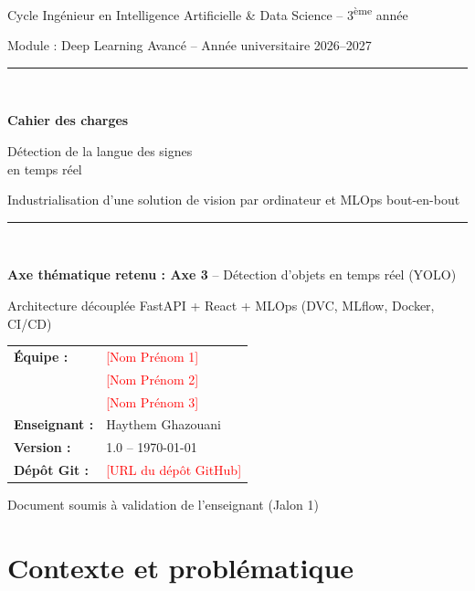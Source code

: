 \documentclass[11pt,a4paper]{article}
\newcommand{\todo}[1]{\textcolor{red}{[#1]}}
\begin{document}
\begin{titlepage}
\centering
\vspace*{1cm}
{\large Cycle Ingénieur en Intelligence Artificielle \& Data Science -- 3\textsuperscript{ème} année\par}
\vspace{0.5cm}
{\large Module : Deep Learning Avancé -- Année universitaire 2026--2027\par}
\vspace{2cm}
{\color{accent}\rule{\linewidth}{1.5pt}}\\[0.6cm]
{\Huge\bfseries Cahier des charges\par}
\vspace{0.4cm}
{\LARGE Détection de la langue des signes\\en temps réel\par}
\vspace{0.4cm}
{\large Industrialisation d'une solution de vision par ordinateur et MLOps bout-en-bout\par}
\vspace{0.3cm}
{\color{accent}\rule{\linewidth}{1.5pt}}\\[1.5cm]

{\large \textbf{Axe thématique retenu : Axe 3} -- Détection d'objets en temps réel (YOLO)\par}
\vspace{0.5cm}
{\large Architecture découplée FastAPI + React + MLOps (DVC, MLflow, Docker, CI/CD)\par}

\vspace{2cm}
\begin{tabular}{ll}
\textbf{Équipe :} & \todo{Nom Prénom 1}\\
 & \todo{Nom Prénom 2}\\
 & \todo{Nom Prénom 3}\\[0.4cm]
\textbf{Enseignant :} & Haythem Ghazouani\\[0.4cm]
\textbf{Version :} & 1.0 -- \today\\
\textbf{Dépôt Git :} & \todo{URL du dépôt GitHub}
\end{tabular}

\vfill
{\small Document soumis à validation de l'enseignant (Jalon 1)}
\end{titlepage}

\tableofcontents
\newpage

\section{Contexte et problématique}
\end{document}
